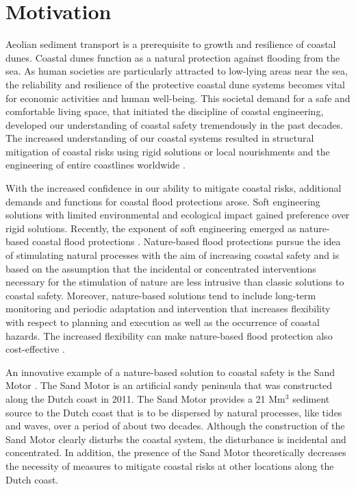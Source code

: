 \section{Motivation}

Aeolian sediment transport is a prerequisite to growth and resilience
of coastal dunes. Coastal dunes function as a natural protection
against flooding from the sea. As human societies are particularly
attracted to low-lying areas near the sea, the reliability and
resilience of the protective coastal dune systems becomes vital for
economic activities and human well-being. This societal demand for a
safe and comfortable living space, that initiated the discipline of
coastal engineering, developed our understanding of coastal safety
tremendously in the past decades. The increased understanding of our
coastal systems resulted in structural mitigation of coastal risks
using rigid solutions or local nourishments \citep{Hamm2002} and the
engineering of entire coastlines worldwide \citep{Donchyts2016}.

With the increased confidence in our ability to mitigate coastal
risks, additional demands and functions for coastal flood protections
arose. Soft engineering solutions with limited environmental and
ecological impact gained preference over rigid solutions. Recently,
the exponent of soft engineering emerged as nature-based coastal flood
protections \citep{Waterman2010, deVriend2015}. Nature-based flood
protections pursue the idea of stimulating natural processes with the
aim of increasing coastal safety and is based on the assumption that
the incidental or concentrated interventions necessary for the
stimulation of nature are less intrusive than classic solutions to
coastal safety. Moreover, nature-based solutions tend to include
long-term monitoring and periodic adaptation and intervention that
increases flexibility with respect to planning and execution as well
as the occurrence of coastal hazards. The increased flexibility can
make nature-based flood protection also cost-effective
\citep{vanSlobbe2013}.

An innovative example of a nature-based solution to coastal safety is
the Sand Motor \citep[or Sand Engine,][]{Stive2013}. The Sand Motor is
an artificial sandy peninsula that was constructed along the Dutch
coast in 2011. The Sand Motor provides a 21 $\mathrm{Mm^3}$ sediment
source to the Dutch coast that is to be dispersed by natural
processes, like tides and waves, over a period of about two
decades. Although the construction of the Sand Motor clearly disturbs
the coastal system, the disturbance is incidental and concentrated. In
addition, the presence of the Sand Motor theoretically decreases the
necessity of measures to mitigate coastal risks at other locations
along the Dutch coast.

